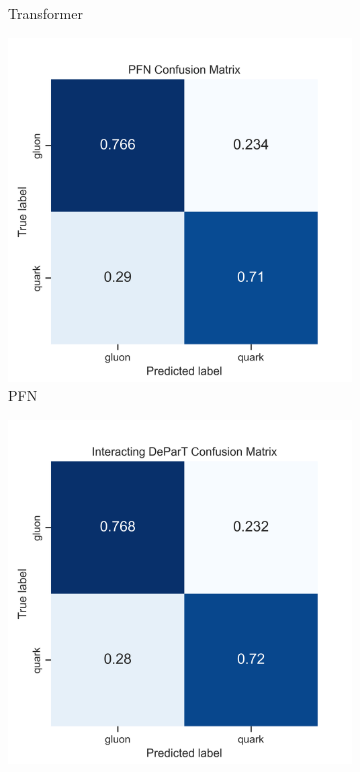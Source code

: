 \begin{figure}[!htb]
\begin{subfigure}[t]{0.38\textwidth}
		\caption{Transformer}
		\label{fig:app_cm_transformer}
	\end{subfigure}
	\begin{subfigure}[t]{0.38\textwidth}
		\includegraphics[width=1\textwidth]{src/plots/results/cm/pfn.png}
		\caption{PFN}
		\label{fig:app_cm_pfn}
	\end{subfigure}
	\begin{subfigure}[t]{0.38\textwidth}
		\includegraphics[width=1\textwidth]{src/plots/results/cm/interacting_depart.png}

\end{subfigure}
\end{figure}

